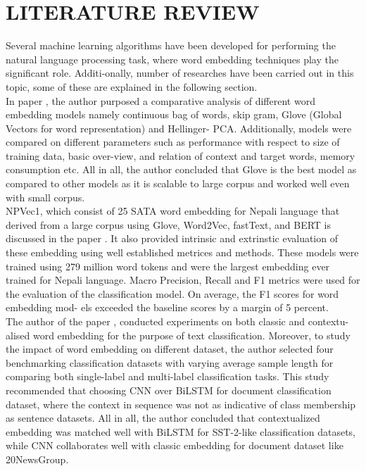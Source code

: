 \chapter{LITERATURE REVIEW}
Several machine learning algorithms have been developed for performing the natural language processing task, where word embedding techniques play the significant role. Additi-onally, number of researches have been carried out in this topic, some of these are explained in the following section.\\
In paper \cite{bhoir2017comparative}, the author purposed a comparative analysis of different word embedding models namely continuous bag of words, skip gram, Glove (Global Vectors for word representation) and Hellinger- PCA. Additionally, models were compared on different parameters such as performance with respect to size of training data, basic over-view, and relation of context and target words, memory consumption etc. All in all, the author concluded that Glove is the best model as compared to other models as it is scalable to large corpus and worked well even with small corpus.\\
NPVec1, which consist of 25 SATA word embedding for Nepali language that derived from a large corpus using Glove, Word2Vec, fastText, and BERT is discussed in the paper  \cite{koirala2021npvec1}.  It also provided intrinsic and extrinstic evaluation of these embedding using well established metrices and methods. These models were trained using 279 million word tokens and were the largest embedding ever trained for Nepali language. Macro Precision, Recall and F1 metrics were used for the evaluation of the classification model. On average, the F1 scores for word embedding mod- els exceeded the baseline scores by a margin of 5 percent.\\
The author of the paper \cite{ajose2020performance}, conducted experiments on both classic and contextu-alised word embedding for the purpose of text classification. Moreover, to study the impact of word embedding on different dataset, the author selected four benchmarking classification datasets with varying average sample length for comparing both single-label and multi-label classification tasks. This study recommended that choosing CNN over BiLSTM for document classification dataset, where the context in sequence was not as indicative of class membership as sentence datasets. All in all, the author concluded that contextualized embedding was matched well with BiLSTM for SST-2-like classification datasets, while CNN collaborates well with classic embedding for document dataset like 20NewsGroup.\\

